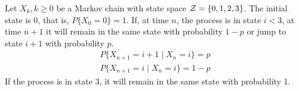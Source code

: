 \ifspanish

\else

Let ${X_k, k \ge 0}$ be a Markov chain with state space ${\cal Z} = \{0, 1, 2, 3\}$. The initial state is 0, that is, $P\{X_0=0\}=1$. If, at time $n$, the process is in state $i<3$, at time $n+1$ it will remain in the same state with probability $1-p$ or jump to state $i+1$ with probability $p$. 
\begin{align*}
P\{X_{n+1}=i+1 \mid X_n=i\} = p   \\
P\{X_{n+1}=i \mid X_n=i\} = 1-p
\end{align*}
If the process is in state 3, it will remain in the same state with probability 1.


